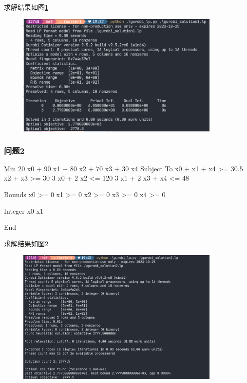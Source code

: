 求解结果如图\ref{fig:ans1}

\begin{figure}[H]
    \begin{center}
        \includegraphics[width=0.9\textwidth]{ans1.png}
    \end{center}
    \caption{}
    \label{fig:ans1}
\end{figure}

\subsubsection{问题2}

\begin{python}
    Min
    20 x0 + 90 x1 + 80 x2 + 70 x3 + 30 x4
    Subject To
        x0 + x1 + x4 >= 30.5
        x2 + x3 >= 30
        3 x0 + 2 x2 <= 120
        3 x1 + 2 x3 + x4 <= 48

    Bounds
    x0 >= 0
    x1 >= 0
    x2 >= 0
    x3 >= 0
    x4 >= 0

    Integer
    x0 x1

    End
\end{python}

求解结果如图\ref{fig:ans2}

\begin{figure}[H]
    \begin{center}
        \includegraphics[width=0.9\textwidth]{ans2.png}
    \end{center}
    \caption{}
    \label{fig:ans2}
\end{figure}

